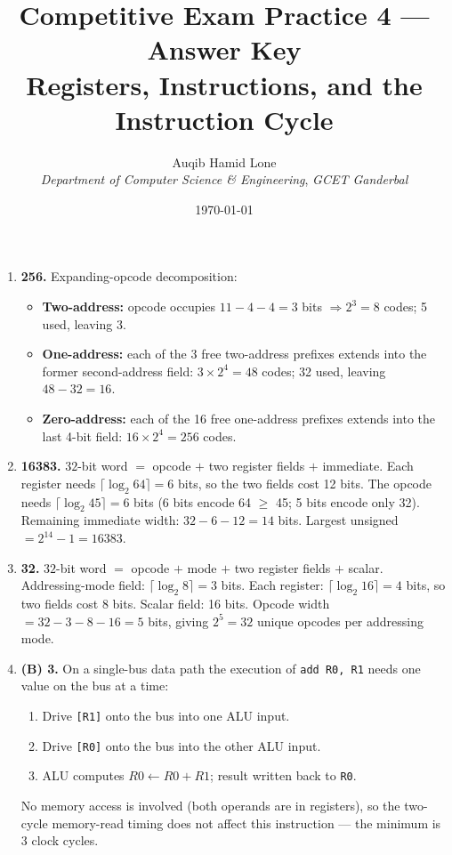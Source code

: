 \documentclass[11pt]{article}
\title{Competitive Exam Practice 4 --- Answer Key\\\large Registers, Instructions, and the Instruction Cycle}
\author{Auqib Hamid Lone\\[0.3em]
  \emph{Department of Computer Science \& Engineering}, \emph{GCET Ganderbal}}
\date{\today}
\begin{document}
\maketitle

\begin{enumerate}
\item[\textbf{Q1}] \textbf{256.} Expanding-opcode decomposition:
\begin{itemize}
  \item \textbf{Two-address:} opcode occupies $11 - 4 - 4 = 3$ bits $\Rightarrow 2^3 = 8$ codes; 5 used, leaving 3.
  \item \textbf{One-address:} each of the 3 free two-address prefixes extends into the former second-address field: $3 \times 2^4 = 48$ codes; 32 used, leaving $48 - 32 = 16$.
  \item \textbf{Zero-address:} each of the 16 free one-address prefixes extends into the last 4-bit field: $16 \times 2^4 = 256$ codes.
\end{itemize}

\item[\textbf{Q2}] \textbf{16383.} $32$-bit word $=$ opcode $+$ two register fields $+$ immediate. Each register needs $\lceil\log_2 64\rceil = 6$ bits, so the two fields cost 12 bits. The opcode needs $\lceil\log_2 45\rceil = 6$ bits (6 bits encode 64 $\geq$ 45; 5 bits encode only 32). Remaining immediate width: $32 - 6 - 12 = 14$ bits. Largest unsigned $= 2^{14} - 1 = 16383$.

\item[\textbf{Q3}] \textbf{32.} $32$-bit word $=$ opcode $+$ mode $+$ two register fields $+$ scalar. Addressing-mode field: $\lceil\log_2 8\rceil = 3$ bits. Each register: $\lceil\log_2 16\rceil = 4$ bits, so two fields cost 8 bits. Scalar field: 16 bits. Opcode width $= 32 - 3 - 8 - 16 = 5$ bits, giving $2^5 = 32$ unique opcodes per addressing mode.

\item[\textbf{Q4}] \textbf{(B) 3.} On a single-bus data path the execution of \texttt{add R0, R1} needs one value on the bus at a time:
\begin{enumerate}
  \item Drive \texttt{[R1]} onto the bus into one ALU input.
  \item Drive \texttt{[R0]} onto the bus into the other ALU input.
  \item ALU computes $R0 \gets R0 + R1$; result written back to \texttt{R0}.
\end{enumerate}
No memory access is involved (both operands are in registers), so the two-cycle memory-read timing does not affect this instruction --- the minimum is 3 clock cycles.


\end{enumerate}
\end{document}
